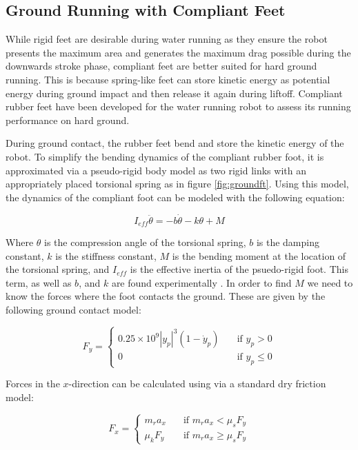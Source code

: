 \documentclass[letterpaper]{article}
\begin{document}
\subsection{Ground Running with Compliant Feet}
While rigid feet are desirable during water running as they ensure the robot presents the maximum area and generates the maximum drag possible during the downwards stroke phase, compliant feet are better suited for hard ground running. This is because spring-like feet can store kinetic energy as potential energy during ground impact and  then release it again during liftoff. Compliant rubber feet have been developed for the water running robot to assess its running performance on hard ground.

During ground contact, the rubber feet bend and store the kinetic energy of the robot. To simplify the bending dynamics of the compliant rubber foot, it is approximated via a pseudo-rigid body model as two rigid links with an appropriately placed torsional spring as in figure \ref{fig:groundft}. Using this model, the dynamics of the compliant foot can be modeled with the following equation:

\begin{equation}
	I_{eff} \ddot{\theta} = -b\dot{\theta} - k\theta + M
\end{equation} 

Where $\theta$ is the compression angle of the torsional spring, $b$ is the damping constant, $k$ is the stiffness constant, $M$ is the bending moment at the location of the torsional spring, and $I_{eff}$ is the effective inertia of the psuedo-rigid foot. This term, as well as $b$, and $k$ are found experimentally \cite{Park2009}. In order to find $M$ we need to know the forces where the foot contacts the ground. These are given by the following ground contact model:

\begin{equation}
F_y = \left\{ \begin{array}{ll} 0.25 \times 10^9 |y_p|^3 (1 - \dot{y}_p) & \quad \textrm{if $y_p > 0$} \\ 0 & \quad \textrm{if $y_p \le 0$} \end{array} \right.
\end{equation}

\noindent Forces in the $x$-direction can be calculated using via a standard dry friction model:

\begin{equation}
F_x = \left\{ \begin{array}{ll} m_r a_x & \quad \textrm{if $m_r a_x < \mu_s F_y$} \\
			                   \mu_k F_y &\quad \textrm{if $m_r a_x \ge \mu_s F_y$}
			  \end{array} \right.
\end{equation}
\end{document}
